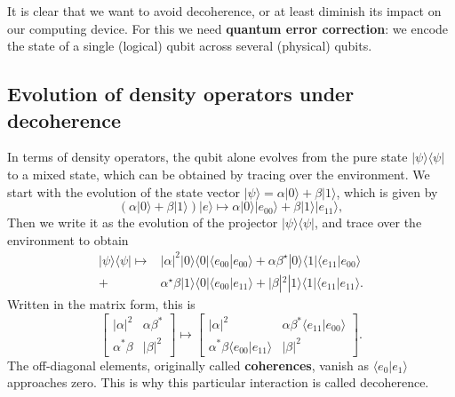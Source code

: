 \documentclass{article}
\newenvironment{idea}%
{\bigskip\noindent\begin{minipage}{\textwidth}\smallskip\begin{tcolorbox}[colback=gray!10,boxrule=0.01mm]}%
{\end{tcolorbox}\end{minipage}\bigskip}
\begin{document}
\begin{idea}

It is clear that we want to avoid decoherence, or at least diminish its impact on our computing device.
For this we need \textbf{quantum error correction}: we encode the state of a single (logical) qubit across several (physical) qubits.

\end{idea}

\hypertarget{evolution-of-density-operators-under-decoherence}{%
\subsection{Evolution of density operators under decoherence}\label{evolution-of-density-operators-under-decoherence}}

In terms of density operators, the qubit alone evolves from the pure state \(|\psi\rangle\langle\psi|\) to a mixed state, which can be obtained by tracing over the environment.
We start with the evolution of the state vector \(|\psi\rangle=\alpha|0\rangle+\beta|1\rangle\), which is given by
\[
  \left( \alpha|0\rangle +\beta |1\rangle\right)|e\rangle \longmapsto
  \alpha |0\rangle|e_{00}\rangle +\beta |1\rangle |e_{11}\rangle,
\]
Then we write it as the evolution of the projector \(|\psi\rangle\langle\psi|\), and trace over the environment to obtain
\[
  \begin{aligned}
    |\psi\rangle\langle\psi| \longmapsto & |\alpha|^2|0\rangle\langle 0| \langle e_{00}|e_{00}\rangle+ \alpha\beta^\star |0\rangle\!\langle 1|\langle e_{11}|e_{00}\rangle
  \\+ &\alpha^\star\beta |1\rangle\!\langle 0|\langle e_{00}|e_{11}\rangle  + |\beta|^2|1\rangle\langle 1|\langle e_{11}|e_{11}\rangle.
  \end{aligned}
\]
Written in the matrix form, this is
\[
  \begin{bmatrix}
    |\alpha|^2 & \alpha\beta^\ast
  \\\alpha^\ast\beta & |\beta|^2
  \end{bmatrix}
  \longmapsto
  \begin{bmatrix}
    |\alpha|^2 & \alpha\beta^\ast \langle e_{11}|e_{00}\rangle
    \\\alpha^\ast\beta \langle e_{00}|e_{11}\rangle & |\beta|^2
  \end{bmatrix}.
\]
The off-diagonal elements, originally called \textbf{coherences}, vanish as \(\langle e_0|e_1\rangle\) approaches zero.
This is why this particular interaction is called decoherence.
\end{document}
